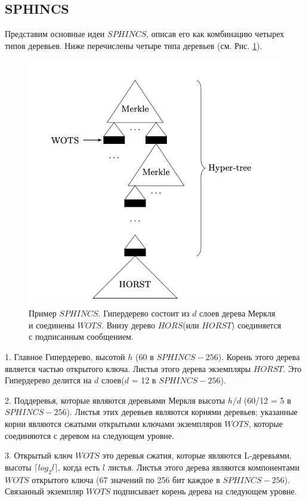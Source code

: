 \documentclass[a4paper, 14pt]{extarticle}
\begin{document}
\subsection{SPHINCS}
Представим основные идеи $SPHINCS$, описав его как комбинацию четырех типов деревьев. Ниже перечислены четыре типа деревьев (см. Рис. \ref{fig:SPHINCS}).

\begin{figure}[h]
    \centering
    \includegraphics[scale=0.85]{SPHINCS.png}
    \caption{Пример $SPHINCS$. Гипердерево состоит из $d$ слоев дерева Меркля и соединены $WOTS$. Внизу дерево $HORS$(или $HORST$) соединяется с подписанным сообщением.}
    \label{fig:SPHINCS}
\end{figure}

1. Главное Гипердерево, высотой $h$ (60 в $SPHINCS-256$). Корень этого дерева является частью открытого ключа. Листья этого дерева экземпляры $HORST$. Это Гипердерево делится на $d$ слоев($d$ = 12 в $SPHINCS-256$).

2. Поддеревья, которые являются деревьями Меркля высоты $h/d$ (60/12 = 5 в $SPHINCS-256$). Листья этих деревьев являются корнями деревьев; указанные корни являются сжатыми открытыми ключами экземпляров $WOTS$, которые соединяются с деревом на следующем уровне.

3. Открытый ключ $WOTS$ это деревья сжатия, которые являются \newline L-деревьями, высоты $\lceil log_{2}l \rceil$, когда есть $l$ листья. Листья этого дерева являются компонентами $WOTS$ открытого ключа (67 значений по 256 бит каждое в $SPHINCS-256$). Связанный экземпляр $WOTS$ подписывает корень дерева на следующем уровне.
\end{document}
